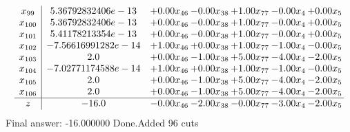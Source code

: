 \documentclass[8pt]{article}
\begin{document}
\[\begin{array}{c| c c@{\hskip 2pt} c@{\hskip 2pt} c@{\hskip 2pt} c@{\hskip 2pt} c@{\hskip 2pt} }
 x_{99}   &  5.36792832406e-13 & +  0.00 x_{46} & -0.00 x_{38} & +  1.00 x_{77} & -0.00 x_{4} & +  0.00 x_{5}\\
 x_{100}   &  5.36792832406e-13 & +  0.00 x_{46} & -0.00 x_{38} & +  1.00 x_{77} & -0.00 x_{4} & +  0.00 x_{5}\\
 x_{101}   &  5.41178213354e-13 & +  0.00 x_{46} & -0.00 x_{38} & +  1.00 x_{77} & -0.00 x_{4} & +  0.00 x_{5}\\
 x_{102}   &  -7.56616991282e-14 & +  1.00 x_{46} & +  0.00 x_{38} & +  1.00 x_{77} & -1.00 x_{4} & -0.00 x_{5}\\
 x_{103}   &  2.0 & +  0.00 x_{46} & -1.00 x_{38} & +  5.00 x_{77} & -4.00 x_{4} & -2.00 x_{5}\\
 x_{104}   &  -7.02771174588e-14 & +  1.00 x_{46} & +  0.00 x_{38} & +  1.00 x_{77} & -1.00 x_{4} & -0.00 x_{5}\\
 x_{105}   &  2.0 & +  0.00 x_{46} & -1.00 x_{38} & +  5.00 x_{77} & -4.00 x_{4} & -2.00 x_{5}\\
 x_{106}   &  2.0 & +  0.00 x_{46} & -1.00 x_{38} & +  5.00 x_{77} & -4.00 x_{4} & -2.00 x_{5}\\
\hline
z    &  -16.0 & -0.00 x_{46} & -2.00 x_{38} & -0.00 x_{77} & -3.00 x_{4} & -2.00 x_{5}\\
\end{array}\]
 Final answer: -16.000000 
Done.Added 96 cuts 
\end{document}
